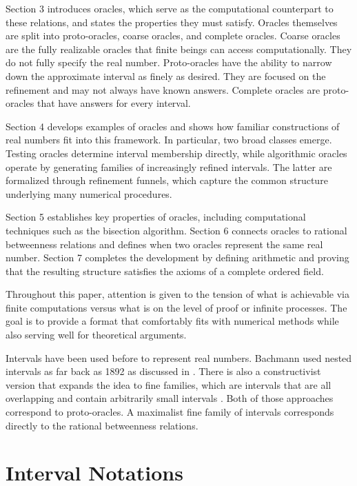 \documentclass[12pt]{article}
\begin{document}
Section 3 introduces oracles, which serve as the computational counterpart to these relations, and states the properties they must satisfy. Oracles themselves are split into proto-oracles, coarse oracles, and complete oracles. Coarse oracles are the fully realizable oracles that finite beings can access computationally. They do not fully specify the real number. Proto-oracles have the ability to narrow down the approximate interval as finely as desired. They are focused on the refinement and may not always have known answers. Complete oracles are proto-oracles that have answers for every interval. 

Section 4 develops examples of oracles and shows how familiar constructions of real numbers fit into this framework. In particular, two broad classes emerge. Testing oracles determine interval membership directly, while algorithmic oracles operate by generating families of increasingly refined intervals. The latter are formalized through refinement funnels, which capture the common structure underlying many numerical procedures.

Section 5 establishes key properties of oracles, including computational techniques such as the bisection algorithm. Section 6 connects oracles to rational betweenness relations and defines when two oracles represent the same real number. Section 7 completes the development by defining arithmetic and proving that the resulting structure satisfies the axioms of a complete ordered field.

Throughout this paper, attention is given to the tension of what is achievable via finite computations versus what is on the level of proof or infinite processes. The goal is to provide a format that comfortably fits with numerical methods while also serving well for theoretical arguments. 

Intervals have been used before to represent real numbers. Bachmann used nested intervals as far back as 1892 as discussed in \cite{ittay-2015}. There is also a constructivist version that expands the idea to fine families, which are intervals that are all overlapping and contain arbitrarily small intervals \cite{bridger}. Both of those approaches correspond to proto-oracles. A maximalist fine family of intervals corresponds directly to the rational betweenness relations. 

\section{Interval Notations}
\end{document}
